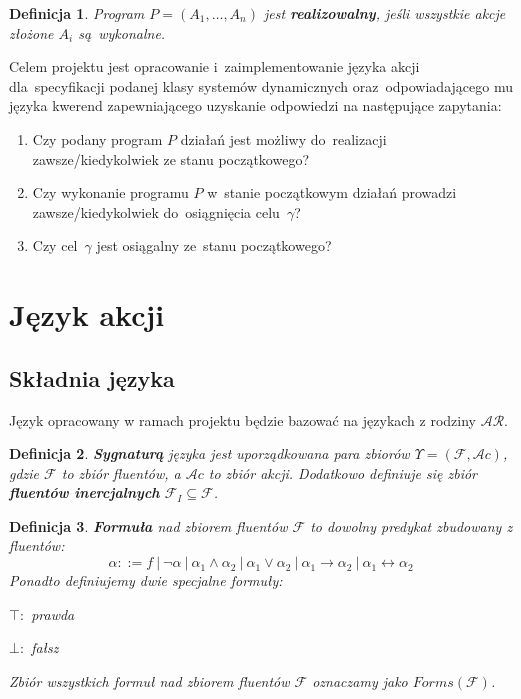 \documentclass[11pt,a4paper]{article}
\newtheorem{defn}{Definicja}
\begin{document}
\begin{defn}
    Program $P = (A_1, \dots, A_n)$ jest \textbf{realizowalny}, jeśli wszystkie akcje złożone $A_i$ są~wykonalne.
\end{defn}

Celem projektu jest opracowanie i~zaimplementowanie języka akcji dla~specyfikacji podanej klasy systemów dynamicznych oraz~odpowiadającego mu języka kwerend zapewniającego uzyskanie odpowiedzi na następujące zapytania:

\begin{enumerate}
    \item Czy podany program $P$ działań jest możliwy do~realizacji zawsze/kiedykolwiek ze stanu początkowego?
    \item Czy wykonanie programu $P$ w~stanie początkowym działań prowadzi zawsze/kiedykolwiek do~osiągnięcia celu~$\gamma$?
    \item Czy cel~$\gamma$ jest osiągalny ze~stanu początkowego?
\end{enumerate}


\section{Język akcji}

\subsection{Składnia języka}

Język opracowany w ramach projektu będzie bazować na językach z rodziny $\mathcal{AR}$.

\begin{defn}
    \textbf{Sygnaturą} języka jest uporządkowana para zbiorów $\Upsilon = (\mathcal{F}, \mathcal{A}c)$, gdzie $\mathcal{F}$ to zbiór fluentów, a $ \mathcal{A}c$ to zbiór akcji. Dodatkowo definiuje się zbiór \textbf{fluentów inercjalnych} $\mathcal{F}_I \subseteq \mathcal{F}$.
\end{defn}

\begin{defn}
    \textbf{Formuła} nad zbiorem fluentów $\mathcal{F}$ to dowolny predykat zbudowany z fluentów: 
    $$ \alpha ::= f\ |\ \neg\alpha\ |\ \alpha_1 \land \alpha_2\ |\ \alpha_1 \lor \alpha_2\ |\ \alpha_1 \rightarrow \alpha_2\ |\ \alpha_1 \leftrightarrow \alpha_2 $$
    Ponadto definiujemy dwie specjalne formuły:
    
    \quad$\top\colon$ prawda
    
    \quad$\bot\colon$ fałsz
    
    Zbiór wszystkich formuł nad zbiorem fluentów $\mathcal{F}$ oznaczamy jako $Forms(\mathcal{F})$.
\end{defn}
\end{document}
